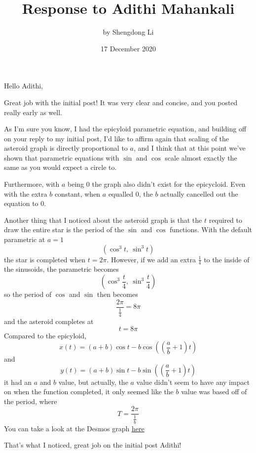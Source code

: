 \documentclass[12pt]{article}
\begin{document}
\title{Response to Adithi Mahankali}
\author{by Shengdong Li}
\date{17 December 2020}
\maketitle

Hello Adithi, 

Great job with the initial post! It was very clear and concise, and you posted really early as well.

As I'm sure you know, I had the epicyloid parametric equation, and building off on your reply to my initial post, I'd like to affirm again that scaling of the asteroid graph is directly proportional to $a$, and I think that at this point we've shown that parametric equations with $\sin$ and $\cos$ scale almost exactly the same as you would expect a circle to. 

Furthermore, with $a$ being $0$ the graph also didn't exist for the epicycloid. Even with the extra $b$ constant, when $a$ equalled $0$, the $b$ actually cancelled out the equation to $0$. 

Another thing that I noticed about the asteroid graph is that the $t$ required to draw the entire star is the period of the $\sin$ and $\cos$ functions. With the default parametric at $a=1$
$$
\left(\cos^{3}t,\ \sin^{3}t\right)
$$
the star is completed when $t=2\pi$.
However, if we add an extra $\frac{1}{4}$ to the inside of the sinusoids, the parametric becomes
$$
\left(\cos^{3}\frac{t}{4},\ \sin^{3}\frac{t}{4}\right)
$$
so the period of $\cos$ and $\sin$ then becomes
$$
\frac{2\pi}{\frac{1}{4}}=8\pi
$$
and the asteroid completes at 
$$
t=8\pi
$$
Compared to the epicyloid, 
$$
x(t)=\left(a+b\right)\cos t-b\cos\left(\left(\frac{a}{b}+1\right)t\right)
$$
and
$$
y(t)=\left(a+b\right)\sin t-b\sin\left(\left(\frac{a}{b}+1\right)t\right)
$$
it had an $a$ and $b$ value, but actually, the $a$ value didn't seem to have any impact on when the function completed, it only seemed like the $b$ value was based off of the period, where
$$
T=\frac{2\pi}{\frac{1}{b}}
$$
You can take a look at the Desmos graph \href{https://www.desmos.com/calculator/1obgsminu6}{here}

That's what I noticed, great job on the initial post Adithi!
\end{document}
